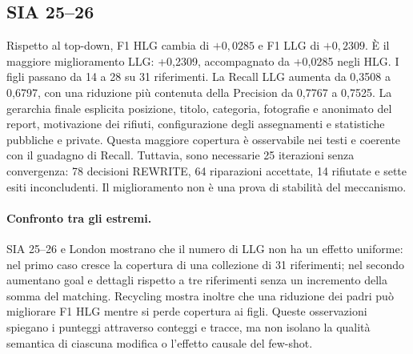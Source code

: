 \subsection{SIA 25--26}
Rispetto al top-down, F1 HLG cambia di $+0,0285$ e F1 LLG di $+0,2309$. È il maggiore miglioramento LLG: +0,2309, accompagnato da +0,0285 negli HLG. I figli passano da 14 a 28 su 31 riferimenti. La Recall LLG aumenta da 0,3508 a 0,6797, con una riduzione più contenuta della Precision da 0,7767 a 0,7525. La gerarchia finale esplicita posizione, titolo, categoria, fotografie e anonimato del report, motivazione dei rifiuti, configurazione degli assegnamenti e statistiche pubbliche e private. Questa maggiore copertura è osservabile nei testi e coerente con il guadagno di Recall. Tuttavia, sono necessarie 25 iterazioni senza convergenza: 78 decisioni REWRITE, 64 riparazioni accettate, 14 rifiutate e sette esiti inconcludenti. Il miglioramento non è una prova di stabilità del meccanismo.

\paragraph{Confronto tra gli estremi.}
SIA 25--26 e London mostrano che il numero di LLG non ha un effetto uniforme:
nel primo caso cresce la copertura di una collezione di 31 riferimenti;
nel secondo aumentano goal e dettagli rispetto a tre riferimenti senza un
incremento della somma del matching. Recycling mostra inoltre che una riduzione
dei padri può migliorare F1 HLG mentre si perde copertura ai figli.
Queste osservazioni spiegano i punteggi attraverso conteggi e tracce, ma non
isolano la qualità semantica di ciascuna modifica o l'effetto causale del few-shot.
